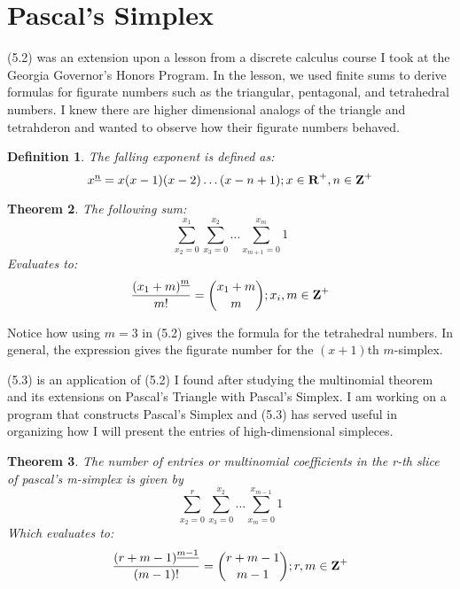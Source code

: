 \documentclass{article}
\newtheorem{theorem}{Theorem}[section]
\newtheorem{definition}[theorem]{Definition}
\begin{document}
\section{Pascal's Simplex}

(5.2) was an extension upon a lesson from a discrete calculus course I took at the Georgia Governor's Honors Program. In the lesson, we used finite sums to derive formulas for figurate numbers such as the triangular, pentagonal, and tetrahedral numbers. I knew there are higher dimensional analogs of the triangle and tetrahderon and wanted to observe how their figurate numbers behaved.

\begin{definition}
    The falling exponent is defined as:
    \[x^{\underline{n}}=x(x-1)(x-2)\dots(x-n+1);x\in\mbox{\textbf{R}}^+,n\in\mbox{\textbf{Z}}^+\]
\end{definition}

\begin{theorem}
    The following sum:
    $$\sum_{x_2 = 0}^{x_1}\sum_{x_3 = 0}^{x_2}\dots\sum_{x_{m+1} = 0}^{x_m}1$$
    Evaluates to:
    $$\frac{{(x_1+m)}^{\underline{m}}}{m!}={{x_1+m} \choose {m}};x_i,m\in\mbox{\textbf{Z}}^+$$
\end{theorem}

Notice how using $m=3$ in (5.2) gives the formula for the tetrahedral numbers. In general, the expression gives the figurate number for the $(x+1)$th $m$-simplex.

(5.3) is an application of (5.2) I found after studying the multinomial theorem and its extensions on Pascal's Triangle with Pascal's Simplex. I am working on a program that constructs Pascal's Simplex and (5.3) has served useful in organizing how I will present the entries of high-dimensional simpleces.

\begin{theorem}
    The number of entries or multinomial coefficients in the r-th slice of pascal's m-simplex is given by 
    $$\sum_{x_2 = 0}^{r}\sum_{x_3 = 0}^{x_2}\dots\sum_{x_{m} = 0}^{x_{m-1}}1$$
    Which evaluates to:
    $$\frac{{(r+m-1)}^{\underline{m-1}}}{(m-1)!}={{r+m-1} \choose {m-1}};r,m\in\mbox{\textbf{Z}}^+$$
\end{theorem}
\end{document}
